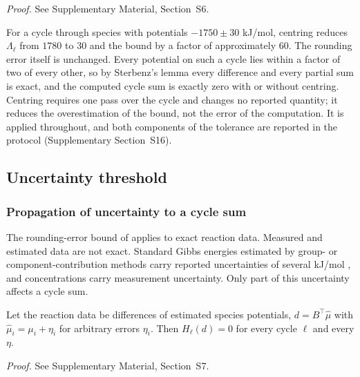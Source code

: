 \documentclass[11pt,a4paper]{article}
\theoremstyle{pstyle}
\theoremstyle{definition}
\theoremstyle{remark}
\newcommand{\hol}{H}
\begin{document}
\noindent\emph{Proof.} See Supplementary Material, Section~S6.

\begin{remark}
\label{rem:gauge-gain}
For a cycle through species with potentials $-1750\pm 30$ kJ/mol,
centring reduces $\Lambda_\ell$ from $1780$ to $30$ and the bound by a
factor of approximately $60$. The rounding error itself is unchanged.
Every potential on such a cycle lies within a factor of two of every
other, so by Sterbenz's lemma every difference and every partial sum is
exact, and the computed cycle sum is exactly zero with or without
centring. Centring requires one pass over the cycle and changes no
reported quantity; it reduces the overestimation of the bound, not the
error of the computation. It is applied throughout, and both components
of the tolerance are reported in the protocol (Supplementary
Section~S16).
\end{remark}

\subsection{Uncertainty threshold}
\label{sec:data-floor}

\subsubsection{Propagation of uncertainty to a cycle sum}

The rounding-error bound of  applies to exact
reaction data. Measured and estimated data are not exact. Standard
Gibbs energies estimated by group- or component-contribution methods
carry reported uncertainties of several kJ/mol
\citep{alberty1998,noor2013,flamholz2012}, and concentrations carry
measurement uncertainty. Only part of this uncertainty affects a cycle
sum.

\begin{lemma}
\label{lem:species-cancel}
Let the reaction data be differences of estimated species potentials,
$d=B^{\top}\hat\mu$ with $\hat\mu_i=\mu_i+\eta_i$ for arbitrary errors
$\eta_i$. Then $\hol_\ell(d)=0$ for every cycle $\ell$ and every $\eta$.
\end{lemma}

\noindent\emph{Proof.} See Supplementary Material, Section~S7.
\end{document}
